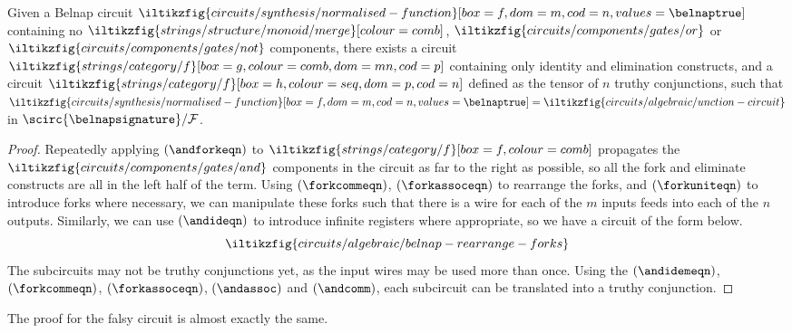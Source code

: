 \begin{lemma}\label{lem:truthy-conjunction-normalising}
    Given a Belnap circuit \(
    \iltikzfig{circuits/synthesis/normalised-function}[box=f,dom=m,cod=n,values=\belnaptrue]
    \) containing no \(
    \iltikzfig{strings/structure/monoid/merge}[colour=comb]
    \), \(
    \iltikzfig{circuits/components/gates/or}
    \) or \(
    \iltikzfig{circuits/components/gates/not}
    \) components, there exists a circuit \(
    \iltikzfig{strings/category/f}[box=g,colour=comb,dom=mn,cod=p]
    \) containing only identity and elimination constructs, and a circuit \(
    \iltikzfig{strings/category/f}[box=h,colour=seq,dom=p,cod=n]
    \) defined as the tensor of \(n\) truthy conjunctions, such that \(
    \iltikzfig{circuits/synthesis/normalised-function}[box=f,dom=m,cod=n,values=\belnaptrue]
    =
    \iltikzfig{circuits/algebraic/unction-circuit}
    \) in \(\scirc{\belnapsignature} / \mathcal{F}\).
\end{lemma}
\begin{proof}
    Repeatedly applying \((\andforkeqn)\) to \(
    \iltikzfig{strings/category/f}[box=f,colour=comb]
    \) propagates the \(
    \iltikzfig{circuits/components/gates/and}
    \) components in the circuit as far to the right as possible, so all the
    fork and eliminate constructs are all in the left half of the term.
    Using \((\forkcommeqn)\), \((\forkassoceqn)\) to rearrange the forks, and
    \((\forkuniteqn)\) to introduce forks where necessary,
    we can manipulate these forks such that there is a wire for each of the \(m\)
    inputs feeds into each of the \(n\) outputs.
    Similarly, we can use \((\andideqn)\) to introduce infinite registers where
    appropriate, so we have a circuit of the form below. \[
        \iltikzfig{circuits/algebraic/belnap-rearrange-forks}
    \]
    The subcircuits may not be truthy conjunctions yet, as the input wires may
    be used more than once.
    Using the \((\andidemeqn)\), \((\forkcommeqn)\), \((\forkassoceqn)\),
    \((\andassoc)\) and \((\andcomm)\), each subcircuit can be translated into
    a truthy conjunction.
\end{proof}

\begin{example}
\end{example}

The proof for the falsy circuit is almost exactly the same.

